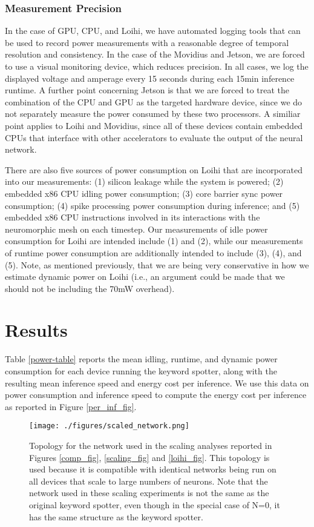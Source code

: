 \documentclass[sigconf, screen]{acmart}
\begin{document}
\subsubsection{Measurement Precision}

In the case of GPU, CPU, and Loihi, we have automated logging tools that can be used to record power measurements with a reasonable degree of temporal resolution and consistency. In the case of the Movidius and Jetson, we are forced to use a visual monitoring device, which reduces precision. In all cases, we log the displayed voltage and amperage every 15 seconds during each 15min inference runtime. A further point concerning Jetson is that we are forced to treat the combination of the CPU and GPU as the targeted hardware device, since we do not separately measure the power consumed by these two processors. A similiar point applies to Loihi and Movidius, since all of these devices contain embedded CPUs that interface with other accelerators to evaluate the output of the neural network.

There are also five sources of power consumption on Loihi that are incorporated into our measurements: (1) silicon leakage while the system is powered; (2) embedded x86 CPU idling power consumption; (3) core barrier sync power consumption; (4) spike processing power consumption during inference; and (5) embedded x86 CPU instructions involved in its interactions with the neuromorphic mesh on each timestep. Our measurements of idle power consumption for Loihi are intended include (1) and (2), while our measurements of runtime power consumption are additionally intended to include (3), (4), and (5). Note, as mentioned previously, that we are being very conservative in how we estimate dynamic power on Loihi (i.e., an argument could be made that we should not be including the 70mW overhead).

\section{Results} 
 
Table \ref{power-table} reports the mean idling, runtime, and dynamic power consumption for each device running the keyword spotter, along with the resulting mean inference speed and energy cost per inference. We use this data on power consumption and inference speed to compute the energy cost per inference as reported in Figure \ref{per_inf_fig}.

\begin{figure*}[ht!]
\centering
    \texttt{[image: ./figures/scaled\_network.png]}
    \caption{Topology for the network used in the scaling analyses reported in Figures \ref{comp_fig}, \ref{scaling_fig} and \ref{loihi_fig}. This topology is used because it is compatible with identical networks being run on all devices that scale to large numbers of neurons. Note that the network used in these scaling experiments is not the same as the original keyword spotter, even though in the special case of N=0, it has the same structure as the keyword spotter.}
\label{scaled_network_fig}
\end{figure*}
\end{document}
